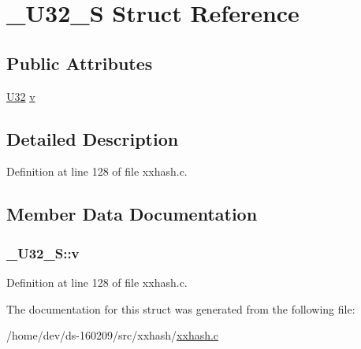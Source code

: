 \hypertarget{struct___u32___s}{}\section{\+\_\+\+U32\+\_\+\+S Struct Reference}
\label{struct___u32___s}
\subsection*{Public Attributes}
\begin{DoxyCompactItemize}
\item 
\hyperlink{lz4_8c_ac3df7cf3c8cb172a588adec881447d68}{U32} \hyperlink{struct___u32___s_a9e62321efa6315b0fb8b252add8029b4}{v}
\end{DoxyCompactItemize}


\subsection{Detailed Description}


Definition at line 128 of file xxhash.\+c.



\subsection{Member Data Documentation}
\hypertarget{struct___u32___s_a9e62321efa6315b0fb8b252add8029b4}{}
\subsubsection[{v}]{ \+\_\+\+U32\+\_\+\+S\+::v}\label{struct___u32___s_a9e62321efa6315b0fb8b252add8029b4}


Definition at line 128 of file xxhash.\+c.



The documentation for this struct was generated from the following file\+:\begin{DoxyCompactItemize}
\item 
/home/dev/ds-\/160209/src/xxhash/\hyperlink{xxhash_8c}{xxhash.\+c}\end{DoxyCompactItemize}
